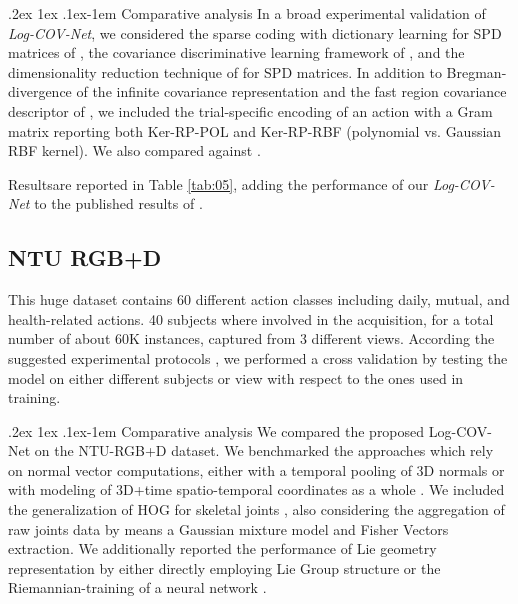 \documentclass[10pt,twocolumn]{article}
\makeatletter
\renewcommand{\paragraph}{%
	\@startsection{paragraph}{4}%
	{\z@}{.2ex \@plus 1ex \@minus .1ex}{-1em}%
	{\normalfont\normalsize\bfseries}%
}
\makeatother
\begin{document}
\paragraph{Comparative analysis} In a broad experimental validation of \textit{Log-COV-Net}, we considered the sparse coding with dictionary learning for SPD matrices of \cite{Har1}, the covariance discriminative learning framework of \cite{COVdiscr}, and the dimensionality reduction technique of \cite{Har2} for SPD matrices. In addition to Bregman-divergence of the infinite covariance representation \cite{Harandi:CVPR14} and the fast region covariance descriptor of \cite{Tuzel}, we included the trial-specific encoding of an action with a Gram matrix \cite{Wang:ICCV15} reporting both Ker-RP-POL and Ker-RP-RBF (polynomial vs. Gaussian RBF kernel). We also compared against \cite{Camps:CVPR16}.

Resultsare reported in Table \ref{tab:05}, adding the performance of our \textit{Log-COV-Net} to the published results of \cite[Table 4.]{Wang:ICCV15}.



\subsection{NTU RGB+D}\label{sez:NTU}

This huge dataset contains 60 different action classes including daily, mutual, and health-related actions. 40 subjects where involved in the acquisition, for a total number of about 60K instances, captured from 3 different views. According the suggested experimental protocols \cite{Shahroudy:CVPR16}, we performed a cross validation by testing the model on either different subjects or view with respect to the ones used in training.

\paragraph{Comparative analysis} We compared the proposed Log-COV-Net on the NTU-RGB+D dataset. We benchmarked the approaches \cite{normal,Hnormal} which rely on normal vector computations, either with a temporal pooling of 3D normals \cite{Hnormal} or with modeling of 3D+time spatio-temporal coordinates as a whole \cite{normal}. We included the generalization of HOG for skeletal joints \cite{H3DJ}, also considering the aggregation of raw joints data by means a Gaussian mixture model and Fisher Vectors extraction. We additionally reported the performance of Lie geometry representation by either directly employing Lie Group structure \cite{Vemulapalli:CVPR14} or the Riemannian-training of a neural network \cite{deeplie}.  
\end{document}

